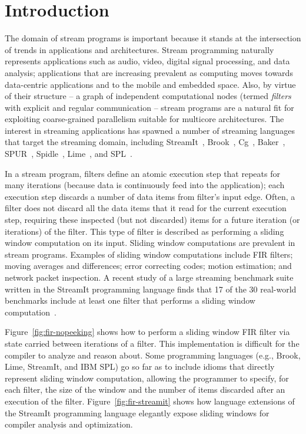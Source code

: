\section{Introduction}

The domain of stream programs is important because it stands at the
intersection of trends in applications and architectures.  Stream
programming naturally represents applications such as audio, video,
digital signal processing, and data analysis; applications that are
increasing prevalent as computing moves towards data-centric
applications and to the mobile and embedded space.  Also, by virtue of
their structure -- a graph of independent computational nodes (termed
{\it filters} with explicit and regular communication -- stream
programs are a natural fit for exploiting coarse-grained parallelism
suitable for multicore architectures.  The interest in streaming
applications has spawned a number of streaming languages that target
the streaming domain, including StreamIt~\cite{streamitcc},
Brook~\cite{brook04}, Cg~\cite{cg03}, Baker~\cite{Baker},
SPUR~\cite{spur05samos}, Spidle~\cite{spidle03}, Lime~\cite{lime10},
and SPL~\cite{spl09}.

In a stream program, filters define an atomic execution step that
repeats for many iterations (because data is continuously feed into
the application); each execution step discards a number of data items
from filter's input edge.  Often, a filter does not discard all the
data items that it read for the current execution step, requiring
these inspected (but not discarded) items for a future iteration (or
iterations) of the filter.  This type of filter is described as
performing a sliding window computation on its input. Sliding window
computations are prevalent in stream programs.  Examples of sliding
window computations include FIR filters; moving averages and
differences; error correcting codes; motion estimation; and network
packet inspection.  A recent study of a large streaming
benchmark suite written in the StreamIt programming language finds
that 17 of the 30 real-world benchmarks include at least one filter
that performs a sliding window computation~\cite{streamit-suite}.


Figure~\ref{fig:fir-nopeeking} shows how to perform a sliding
window FIR filter via state carried between iterations of a filter.
This implementation is difficult for the compiler to analyze and
reason about.  Some programming languages (e.g., Brook, Lime,
StreamIt, and IBM SPL) go so far as to include idioms that directly
represent sliding window computation, allowing the programmer to
specify, for each filter, the size of the window and the number of
items discarded after an execution of the filter.
Figure~\ref{fig:fir-streamit} shows how language extensions of the
StreamIt programming language elegantly expose sliding windows for
compiler analysis and optimization.


